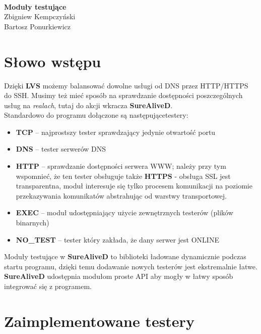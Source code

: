 \documentclass[polish,12pt]{article}
\begin{document}
\thispagestyle{empty}
~
\vspace{8em}
~
\begin{center}
\end{center}
\begin{center}
  \textbf{\Large Moduły testujące}\\
  \vspace{2em}
  \large
  Zbigniew Kempczyński\\
  Bartosz Ponurkiewicz
\end{center}
\newpage

\tableofcontents
\newpage
\section{Słowo wstępu}
Dzięki \textbf{LVS} możemy balansować dowolne
usługi od DNS przez HTTP/HTTPS do SSH. Musimy też mieć sposób na sprawdzanie
dostępności poszczególnych usług na \textit{realach}, tutaj do akcji wkracza
\textbf{SureAliveD}.\\
Standardowo do programu dołączone są następującetestery:
\begin{itemize}
  \item \textbf{TCP} -- najprostszy tester sprawdzający jedynie otwartość portu
  \item \textbf{DNS} -- tester serwerów DNS
  \item \textbf{HTTP} -- sprawdzanie dostępności serwera WWW; należy przy tym wspomnieć,
    że ten tester obsługuje także \textbf{HTTPS} - obsługa SSL jest transparentna,
    moduł interesuje się tylko procesem komunikacji na poziomie przekazywania komunikatów
    abstrahując od warstwy transportowej.
  \item \textbf{EXEC} -- moduł udostępniający użycie zewnętrznych testerów (plików binarnych)
  \item \textbf{NO\_TEST} -- tester który zakłada, że dany serwer jest ONLINE
\end{itemize}

Moduły testujące w \textbf{SureAliveD} to biblioteki ładowane dynamicznie podczas
startu programu, dzięki temu dodawanie nowych testerów jest ekstremalnie łatwe.
\textbf{SureAliveD} udostępnia modułom proste API aby mogły w łatwy sposób integrować
się z programem.

\newpage

\section{Zaimplementowane testery}
\end{document}
